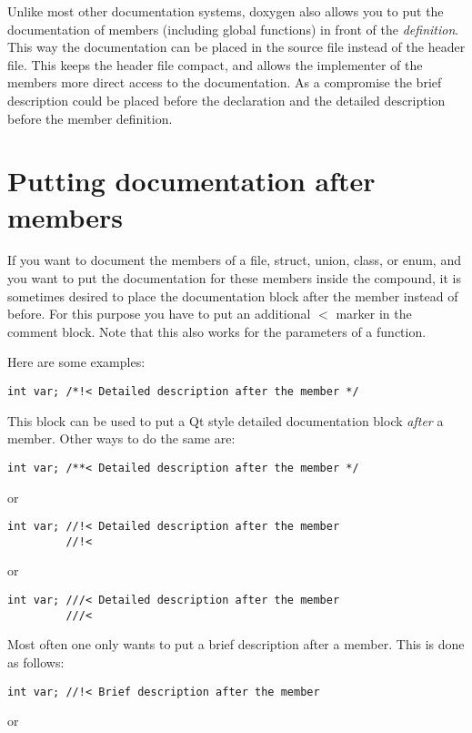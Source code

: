 Unlike most other documentation systems, doxygen also allows you to put the documentation of members (including global functions) in front of the {\em definition\/}. This way the documentation can be placed in the source file instead of the header file. This keeps the header file compact, and allows the implementer of the members more direct access to the documentation. As a compromise the brief description could be placed before the declaration and the detailed description before the member definition.\hypertarget{docblocks_memberdoc}{}\section{Putting documentation after members}\label{docblocks_memberdoc}
If you want to document the members of a file, struct, union, class, or enum, and you want to put the documentation for these members inside the compound, it is sometimes desired to place the documentation block after the member instead of before. For this purpose you have to put an additional $<$ marker in the comment block. Note that this also works for the parameters of a function.

Here are some examples: 

\footnotesize\begin{verbatim}
int var; /*!< Detailed description after the member */
\end{verbatim}
\normalsize
 This block can be used to put a Qt style detailed documentation block {\em after\/} a member. Other ways to do the same are: 

\footnotesize\begin{verbatim}
int var; /**< Detailed description after the member */
\end{verbatim}
\normalsize
 or 

\footnotesize\begin{verbatim}
int var; //!< Detailed description after the member
         //!< 
\end{verbatim}
\normalsize
 or 

\footnotesize\begin{verbatim}
int var; ///< Detailed description after the member
         ///< 
\end{verbatim}
\normalsize


Most often one only wants to put a brief description after a member. This is done as follows: 

\footnotesize\begin{verbatim}
int var; //!< Brief description after the member
\end{verbatim}
\normalsize
 or 

